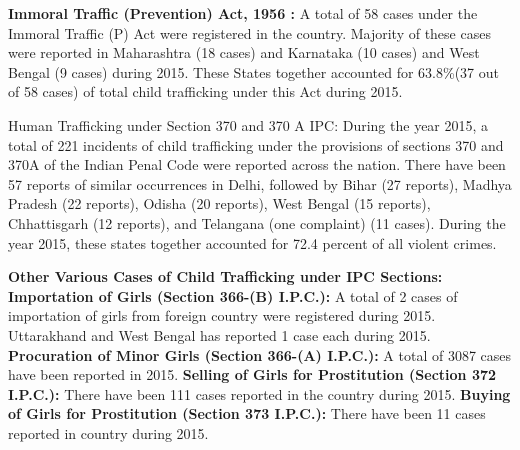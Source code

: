 \begin{multicols}{2}
\noi
\textbf{Immoral Traffic (Prevention) Act, 1956 :} A total of 58 cases under the Immoral
Traffic (P) Act were registered in the country. Majority of these cases were reported in
Maharashtra (18 cases) and Karnataka (10 cases) and West Bengal (9 cases) during
2015. These States together accounted for 63.8\%(37 out of 58 cases) of total child
trafficking under this Act during 2015.

\noi
Human Trafficking under Section 370 and 370 A IPC: During the year 2015, a total of
221 incidents of child trafficking under the provisions of sections 370 and 370A of the
Indian Penal Code were reported across the nation. There have been 57 reports of
similar occurrences in Delhi, followed by Bihar (27 reports), Madhya Pradesh (22
reports), Odisha (20 reports), West Bengal (15 reports), Chhattisgarh (12 reports), and
Telangana (one complaint) (11 cases). During the year 2015, these states together
accounted for 72.4 percent of all violent crimes.

\noi
\textbf{Other Various Cases of Child Trafficking under IPC Sections: Importation of
Girls (Section 366-(B) I.P.C.):} A total of 2 cases of importation of girls from foreign
country were registered during 2015. Uttarakhand and West Bengal has reported 1 case
each during 2015. \textbf{Procuration of Minor Girls (Section 366-(A) I.P.C.):} A total of
3087 cases have been reported in 2015. \textbf{Selling of Girls for Prostitution (Section 372
I.P.C.):} There have been 111 cases reported in the country during 2015. \textbf{Buying of
Girls for Prostitution (Section 373 I.P.C.):} There have been 11 cases reported in
country during 2015.


\end{multicols}
